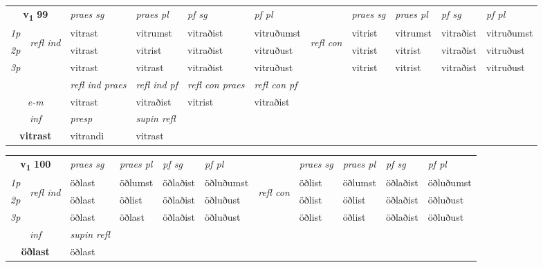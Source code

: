 \noindent
\begin{tabular}{lllllllllll} \toprule
\multicolumn{2}{c}{\textbf{v{\textsubscript{1}}} \Large{\textbf{99}}}  &  \textit{praes sg}  & \textit{praes pl}  &\textit{ pf sg} & \textit{pf pl} &  &  \textit{praes sg}  & \textit{praes pl}  & \textit{pf sg} & \textit{pf pl } \\*
	\cmidrule{3-6} \cmidrule{8-11}
 {\textit{1p}} & \multirow{3}{*}{\begin{turn}{90}\textit{refl ind}\end{turn}}  & vitrast & vitrumst & vitraðist & vitruðumst & \multirow{3}{*}{\begin{turn}{90}\textit{refl con}\end{turn}}  &vitrist & vitrumst & vitraðist & vitruðumst \\*
 {\textit{2p}} &  & vitrast & vitrist & vitraðist & vitruðust & &vitrist & vitrist & vitraðist & vitruðust \\*
 {\textit{3p}}  & & vitrast & vitrast & vitraðist & vitruðust & & vitrist & vitrist& vitraðist & vitruðust \\*
\cmidrule{3-6} \cmidrule{8-11}

 & & \textit{refl ind praes} & \textit{refl ind pf} & \textit{refl con praes} & \textit{refl con pf} \\*
 \multicolumn{2}{c}{ \textit{e-m} }& vitrast & vitraðist & vitrist & vitraðist \\*

\cmidrule{3-4}
   \multicolumn{2}{c}{\textit{inf}}     & \textit{presp}  & \textit{supin refl}  \\*
  \multicolumn{2}{c}{\textbf{vitrast}}      & vitrandi  & vitrast  \\*
\end{tabular}

\noindent
\begin{tabular}{lllllllllll} \toprule
\multicolumn{2}{c}{\textbf{v{\textsubscript{1}}} \Large{\textbf{100}}}  &  \textit{praes sg}  & \textit{praes pl}  &\textit{ pf sg} & \textit{pf pl} &  &  \textit{praes sg}  & \textit{praes pl}  & \textit{pf sg} & \textit{pf pl } \\*
	\cmidrule{3-6} \cmidrule{8-11}
 {\textit{1p}} & \multirow{3}{*}{\begin{turn}{90}\textit{refl ind}\end{turn}}  & öðlast & öðlumst & öðlaðist & öðluðumst & \multirow{3}{*}{\begin{turn}{90}\textit{refl con}\end{turn}}  &öðlist & öðlumst & öðlaðist & öðluðumst \\*
 {\textit{2p}} &  & öðlast & öðlist & öðlaðist & öðluðust & &öðlist & öðlist & öðlaðist & öðluðust \\*
 {\textit{3p}}  & & öðlast & öðlast & öðlaðist & öðluðust & & öðlist & öðlist& öðlaðist & öðluðust \\*
\cmidrule{3-6} \cmidrule{8-11}

   \multicolumn{2}{c}{\textit{inf}}       & \textit{supin refl}  \\*
  \multicolumn{2}{c}{\textbf{öðlast}}        & öðlast  \\*
\end{tabular}

